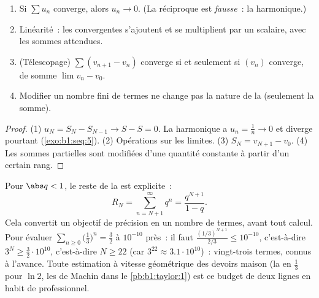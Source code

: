 \begin{proposition}\label{prop:b1:series:first}
\begin{enumerate}
  \item Si $\sum u_n$ converge, alors $u_n \to 0$. (La réciproque est
        \emph{fausse}~: la  harmonique.)
  \item Linéarité~: les  convergentes s'ajoutent et se
        multiplient par un scalaire, avec les sommes attendues.
  \item (Télescopage) $\sum (v_{n+1} -
        v_n)$ converge si et seulement si $(v_n)$ converge, de somme
        $\lim v_n - v_0$.
  \item Modifier un nombre fini de termes ne change pas la nature de
        la  (seulement la somme).
\end{enumerate}
\end{proposition}

\begin{proof}
(1) $u_N = S_N - S_{N-1} \to S - S = 0$. La  harmonique a
$u_n = \frac1n \to 0$ et diverge pourtant (\cref{exo:b1:seq:5}). (2)
Opérations sur les limites. (3) $S_N = v_{N+1} - v_0$. (4) Les sommes
partielles sont modifiées d'une quantité constante à partir d'un
certain rang.
\end{proof}

\begin{example}\label{ex:b1:series:georemainder}
Pour $\abs q < 1$, le reste de la  est
explicite~:
\[
R_N = \sum_{n = N+1}^{\infty} q^n = \frac{q^{N+1}}{1 - q} .
\]
Cela convertit un objectif de précision en un nombre de termes,
avant tout calcul. Pour évaluer $\sum_{n\geq0} \bigl(\frac13\bigr)^n =
\frac32$ à $10^{-10}$ près~: il faut $\frac{(1/3)^{N+1}}{2/3} \leq
10^{-10}$, c'est-à-dire $3^{N} \geq \frac{3}{2}\cdot 10^{10}$,
c'est-à-dire $N \geq 22$ (car $3^{22} \approx 3.1\cdot10^{10}$)~:
vingt-trois termes, connus à l'avance. Toute estimation à vitesse
géométrique des devoirs maison (la  en $\frac13$ pour $\ln 2$,
les  de Machin dans le \cref{pb:b1:taylor:1}) est ce
budget de deux lignes en habit de professionnel.
\end{example}

